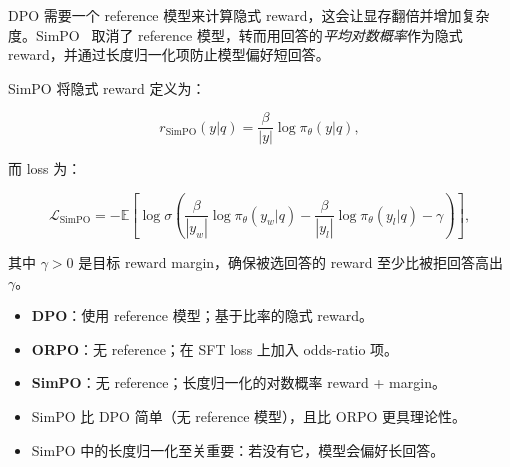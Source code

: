 \begin{intuitionbox}[无参考模型的偏好学习]
DPO 需要一个 reference 模型来计算隐式 reward，这会让显存翻倍并增加复杂度。SimPO~\cite{meng2024simpo} 取消了 reference 模型，转而用回答的\emph{平均对数概率}作为隐式 reward，并通过长度归一化项防止模型偏好短回答。
\end{intuitionbox}

SimPO 将隐式 reward 定义为：

\[
r_{\text{SimPO}}(y|q) = \frac{\beta}{|y|} \log \pi_\theta(y|q),
\]

而 loss 为：

\[
\boxed{
    \mathcal{L}_{\text{SimPO}} = -\mathbb{E}\!\left[
      \log \sigma\!\left(
        \frac{\beta}{|y_w|}\log\pi_\theta(y_w|q)
        - \frac{\beta}{|y_l|}\log\pi_\theta(y_l|q)
        - \gamma
      \right)
    \right],
  }
\]

其中 $\gamma > 0$ 是目标 reward margin，确保被选回答的 reward 至少比被拒回答高出 $\gamma$。

\begin{keybox}
\begin{itemize}
  \item \textbf{DPO}：使用 reference 模型；基于比率的隐式 reward。
  \item \textbf{ORPO}：无 reference；在 SFT loss 上加入 odds-ratio 项。
  \item \textbf{SimPO}：无 reference；长度归一化的对数概率 reward + margin。
  \item SimPO 比 DPO 简单（无 reference 模型），且比 ORPO 更具理论性。
  \item SimPO 中的长度归一化至关重要：若没有它，模型会偏好长回答。
\end{itemize}
\end{keybox}

